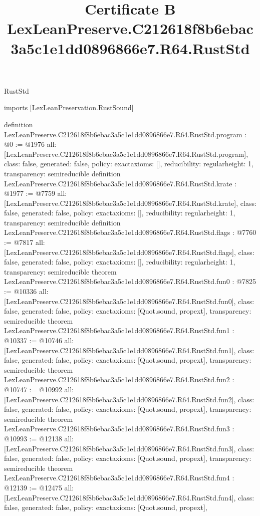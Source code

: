 \begin{lexlean}{RustStd}
\title{Certificate B LexLeanPreserve.C212618f8b6ebac3a5c1e1dd0896866e7.R64.RustStd}
\begin{coremodule}
imports [LexLeanPreservation.RustSound]

definition LexLeanPreserve.C212618f8b6ebac3a5c1e1dd0896866e7.R64.RustStd.program : @0 := @1976 {
  all: [LexLeanPreserve.C212618f8b6ebac3a5c1e1dd0896866e7.R64.RustStd.program],
  class: false,
  generated: false,
  policy: exact{axioms: []},
  reducibility: regular{height: 1},
  transparency: semireducible
}
definition LexLeanPreserve.C212618f8b6ebac3a5c1e1dd0896866e7.R64.RustStd.krate : @1977 := @7759 {
  all: [LexLeanPreserve.C212618f8b6ebac3a5c1e1dd0896866e7.R64.RustStd.krate],
  class: false,
  generated: false,
  policy: exact{axioms: []},
  reducibility: regular{height: 1},
  transparency: semireducible
}
definition LexLeanPreserve.C212618f8b6ebac3a5c1e1dd0896866e7.R64.RustStd.flags : @7760 := @7817 {
  all: [LexLeanPreserve.C212618f8b6ebac3a5c1e1dd0896866e7.R64.RustStd.flags],
  class: false,
  generated: false,
  policy: exact{axioms: []},
  reducibility: regular{height: 1},
  transparency: semireducible
}
theorem LexLeanPreserve.C212618f8b6ebac3a5c1e1dd0896866e7.R64.RustStd.fun0 : @7825 := @10336 {
  all: [LexLeanPreserve.C212618f8b6ebac3a5c1e1dd0896866e7.R64.RustStd.fun0],
  class: false,
  generated: false,
  policy: exact{axioms: [Quot.sound, propext]},
  transparency: semireducible
}
theorem LexLeanPreserve.C212618f8b6ebac3a5c1e1dd0896866e7.R64.RustStd.fun1 : @10337 := @10746 {
  all: [LexLeanPreserve.C212618f8b6ebac3a5c1e1dd0896866e7.R64.RustStd.fun1],
  class: false,
  generated: false,
  policy: exact{axioms: [Quot.sound, propext]},
  transparency: semireducible
}
theorem LexLeanPreserve.C212618f8b6ebac3a5c1e1dd0896866e7.R64.RustStd.fun2 : @10747 := @10992 {
  all: [LexLeanPreserve.C212618f8b6ebac3a5c1e1dd0896866e7.R64.RustStd.fun2],
  class: false,
  generated: false,
  policy: exact{axioms: [Quot.sound, propext]},
  transparency: semireducible
}
theorem LexLeanPreserve.C212618f8b6ebac3a5c1e1dd0896866e7.R64.RustStd.fun3 : @10993 := @12138 {
  all: [LexLeanPreserve.C212618f8b6ebac3a5c1e1dd0896866e7.R64.RustStd.fun3],
  class: false,
  generated: false,
  policy: exact{axioms: [Quot.sound, propext]},
  transparency: semireducible
}
theorem LexLeanPreserve.C212618f8b6ebac3a5c1e1dd0896866e7.R64.RustStd.fun4 : @12139 := @12475 {
  all: [LexLeanPreserve.C212618f8b6ebac3a5c1e1dd0896866e7.R64.RustStd.fun4],
  class: false,
  generated: false,
  policy: exact{axioms: [Quot.sound, propext]},
}
\end{coremodule}
\end{lexlean}
